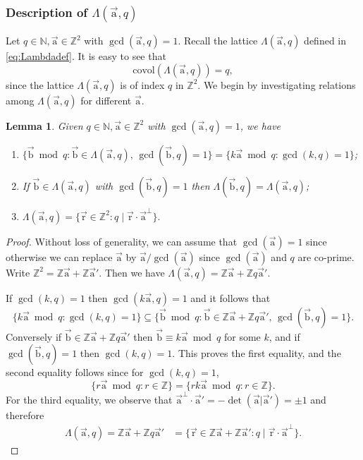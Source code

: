 \documentclass[letterpaper,11pt]{amsart}
\numberwithin{equation}{section}
\newtheorem{lemma}[theorem]{Lemma}
\theoremstyle{definition}
\numberwithin{equation}{section}
\newcommand{\Z}{\mathbb{Z}}
\newcommand{\ZZ}{\mathbb{Z}}
\newcommand{\NN}{\mathbb{N}}
\newcommand{\ua}{\vec{\mathrm{a}}}
\newcommand{\ub}{\vec{\mathrm{b}}}
\newcommand{\ur}{\vec{\mathrm{r}}}
\begin{document}
\subsubsection{Description of $\Lambda(\ua, q)$}  
 Let $q\in\NN, \ua \in \Z^2$ with $\gcd(\ua,q)=1$. Recall the lattice $\Lambda(\ua,q)$ defined in \eqref{eq:Lambdadef}. 
 It is easy to see that
\begin{equation*}
\mathrm{covol}(\Lambda(\ua,q))=q,
\end{equation*}
since the lattice $\Lambda(\ua,q)$ is of index $q$ in $\ZZ^2$.
 We begin by investigating relations among $\Lambda(\ua, q)$ for different $\ua$.
\begin{lemma}\label{lem:lattice}
	Given $q\in\NN, \ua \in \Z^2$ with \(\gcd(\ua,q)=1\), we have
\begin{enumerate}[$(1)$]
	\item 	$\{\ub \bmod q : \ub \in\Lambda(\ua,q),\, \gcd(\ub,q)=1 \}
	=\{k\ua \bmod q : \gcd(k,q)=1\}$;
	\item If $\ub\in \Lambda(\ua,q)$ with $\gcd(\ub,q)=1$ then
	$\Lambda(\ub,q)
	= \Lambda(\ua,q)$;
	\item $\Lambda(\ua,q)=\{\ur\in \Z^2 : q\mid \ur\cdot \ua^\perp\}.$
\end{enumerate}
		
\end{lemma}

\begin{proof}
Without loss of generality, we can assume that \(\gcd(\ua)=1\) since otherwise we can replace \(\ua\) by $\ua/\gcd(\ua)$ since $\gcd(\ua)$ and $q$ are co-prime. 
Write \(\Z^2 = \Z\ua + \Z\ua'\). Then we have  \(\Lambda(\ua,q) = \Z\ua + \Z q\ua'\).

If \(\gcd(k,q)=1 \) then \(\gcd(k\ua,q)=1\) and it follows that 
\[
\{k\ua \bmod q : \gcd(k,q)=1\}
\subseteq
\{\ub \bmod q : \ub \in  \Z\ua + \Z q\ua',\, \gcd(\ub,q)=1 \}.
\]
Conversely if \(\ub  \in \Z\ua + \Z q\ua'\) then \(\ub\equiv k\ua \bmod q \) for some \(k\), and if \(\gcd(\ub,q)=1\) then \(\gcd(k,q)=1\). This proves the first equality, and the second equality follows since for $\gcd(k, q)=1$,
\[
\{r\ua \bmod q :r\in \Z\}
=
\{rk\ua \bmod q: r\in \Z \}.
\]
For the third equality, we observe that \(\ua^\perp \cdot \ua' =- \det(\ua|\ua') = \pm 1\) and therefore
\begin{align*}
 \Lambda(\ua, q)=\Z\ua + \Z q\ua'
&=
\{\ur \in  \Z\ua + \Z \ua': q\mid\ur\cdot \ua^\perp\}.
\end{align*}
\end{proof}
 
\end{document}
